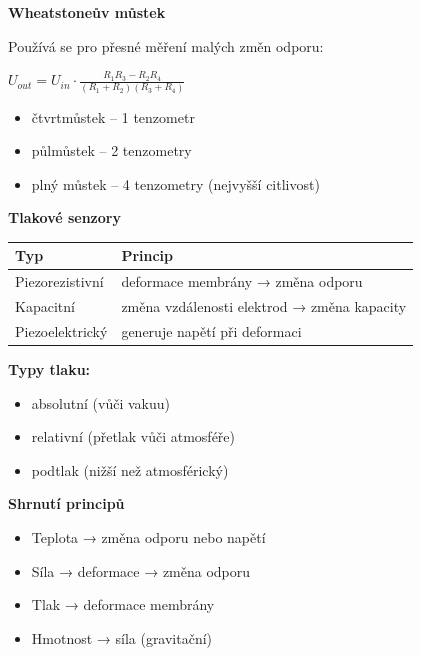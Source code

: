 \documentclass[a4paper,10pt]{article}
\begin{document}
\begin{vysvetlenibox}
\textbf{Wheatstoneův můstek}

Používá se pro přesné měření malých změn odporu:

\begin{vzorcebox}
$U_{out} = U_{in} \cdot \frac{R_1 R_3 - R_2 R_4}{(R_1+R_2)(R_3+R_4)}$
\end{vzorcebox}

\begin{itemize}
\item čtvrtmůstek -- 1 tenzometr
\item půlmůstek -- 2 tenzometry
\item plný můstek -- 4 tenzometry (nejvyšší citlivost)
\end{itemize}

\textbf{Tlakové senzory}

\begin{center}
\begin{tabularx}{0.95\linewidth}{l X}
Typ & Princip \\
\hline
Piezorezistivní & deformace membrány → změna odporu \\
Kapacitní & změna vzdálenosti elektrod → změna kapacity \\
Piezoelektrický & generuje napětí při deformaci \\
\end{tabularx}
\end{center}

\textbf{Typy tlaku:}
\begin{itemize}
\item absolutní (vůči vakuu)
\item relativní (přetlak vůči atmosféře)
\item podtlak (nižší než atmosférický)
\end{itemize}

\textbf{Shrnutí principů}

\begin{itemize}
\item Teplota → změna odporu nebo napětí
\item Síla → deformace → změna odporu
\item Tlak → deformace membrány
\item Hmotnost → síla (gravitační)
\end{itemize}

\end{vysvetlenibox}
\end{document}
